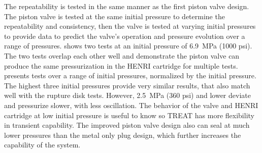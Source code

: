 The repeatability is tested in the same manner as the first piston valve design. The piston valve is tested at the same initial pressure to determine the repeatability and consistency, then the valve is tested at varying initial pressures to provide data to predict the valve's operation and pressure evolution over a range of pressures.  shows two tests at an initial pressure of \SI{6.9}{\mega\pascal} (1000 psi). The two tests overlap each other well and demonstrate the piston valve can produce the same pressurization in the HENRI cartridge for multiple tests.  presents tests over a range of initial pressures, normalized by the initial pressure. The highest three initial pressures provide very similar results, that also match well with the rupture disk tests. However, \SI{2.5}{\mega\pascal} (360 psi) and lower deviate and pressurize slower, with less oscillation. The behavior of the valve and HENRI cartridge at low initial pressure is useful to know so TREAT has more flexibility in transient capability. The improved piston valve design also can seal at much lower pressures than the metal only plug design, which further increases the capability of the system.

